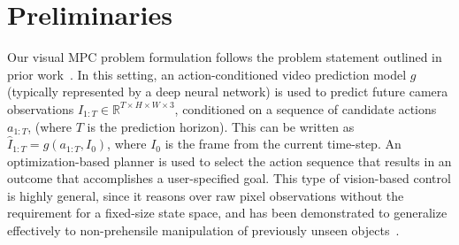 \vspace{-0.1cm}
\section{Preliminaries}
\label{sec:prelim}
\vspace{-0.2cm}

Our visual MPC problem formulation follows the problem statement outlined in prior work~\cite{foresight}. In this setting, an action-conditioned video prediction model $g$ (typically represented by a deep neural network) is used to predict future camera observations $\hat{I}_{1:T} \in \mathbb{R}^{T \times H\times W \times 3}$, conditioned on a sequence of candidate actions $a_{1:T}$, (where $T$ is the prediction horizon). This can be written as $\hat{I}_{1:T} = g(a_{1:T}, I_0)$, where $I_0$ is the frame from the current time-step. An optimization-based planner is  used to select the action sequence that results in an outcome that accomplishes a user-specified goal. This type of vision-based control is highly general, since it reasons over raw pixel observations without the requirement for a fixed-size state space, and has been demonstrated to generalize effectively to non-prehensile manipulation of previously unseen objects~\cite{foresight,sna}.

